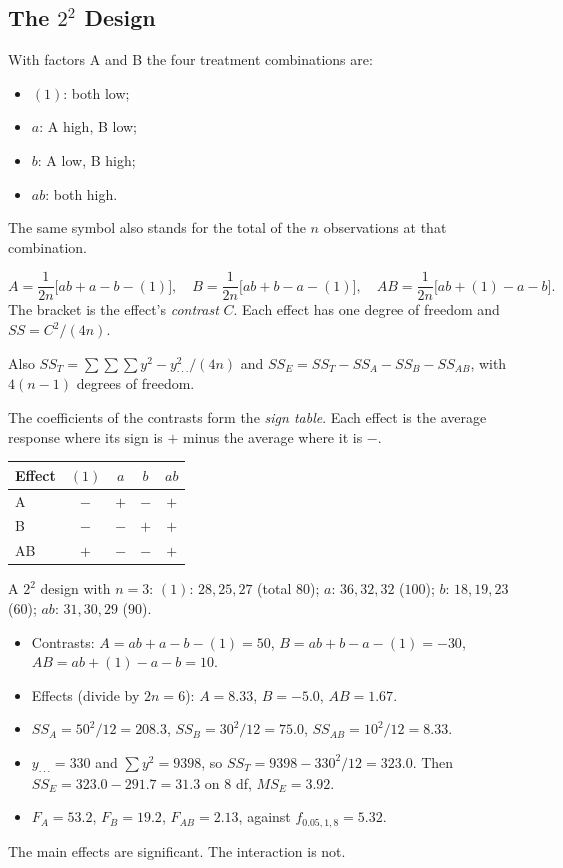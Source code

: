 \subsection{The $2^2$ Design}

With factors A and B the four treatment combinations are:
\begin{itemize}
  \item $(1)$: both low;
  \item $a$: A high, B low;
  \item $b$: A low, B high;
  \item $ab$: both high.
\end{itemize}
The same symbol also stands for the total of the $n$ observations at that combination.

\begin{theorem}\label{thm:2k2}
\[ A=\frac1{2n}\big[ab+a-b-(1)\big],\quad B=\frac1{2n}\big[ab+b-a-(1)\big],\quad AB=\frac1{2n}\big[ab+(1)-a-b\big]. \]
The bracket is the effect's \emph{contrast} $C$. Each effect has one degree of freedom and $SS=C^2/(4n)$.

Also $SS_T=\sum\sum\sum y^2-y_{\cdot\cdot\cdot}^2/(4n)$ and $SS_E=SS_T-SS_A-SS_B-SS_{AB}$, with $4(n-1)$ degrees of freedom.
\end{theorem}

The coefficients of the contrasts form the \emph{sign table}. Each effect is the average response where its sign is $+$ minus the average where it is $-$.

\begin{center}
\begin{tabular}{l|cccc}
\toprule
Effect & $(1)$ & $a$ & $b$ & $ab$\\
\midrule
A & $-$ & $+$ & $-$ & $+$\\
B & $-$ & $-$ & $+$ & $+$\\
AB & $+$ & $-$ & $-$ & $+$\\
\bottomrule
\end{tabular}
\end{center}

\begin{example}\label{ex:22}
A $2^2$ design with $n=3$: $(1)$: $28,25,27$ (total $80$); $a$: $36,32,32$ ($100$); $b$: $18,19,23$ ($60$); $ab$: $31,30,29$ ($90$).
\begin{itemize}
  \item Contrasts: $A=ab+a-b-(1)=50$, $B=ab+b-a-(1)=-30$, $AB=ab+(1)-a-b=10$.
  \item Effects (divide by $2n=6$): $A=8.33$, $B=-5.0$, $AB=1.67$.
  \item $SS_A=50^2/12=208.3$, $SS_B=30^2/12=75.0$, $SS_{AB}=10^2/12=8.33$.
  \item $y_{\cdot\cdot\cdot}=330$ and $\sum y^2=9398$, so $SS_T=9398-330^2/12=323.0$. Then $SS_E=323.0-291.7=31.3$ on $8$ df, $MS_E=3.92$.
  \item $F_A=53.2$, $F_B=19.2$, $F_{AB}=2.13$, against $f_{0.05,1,8}=5.32$.
\end{itemize}
The main effects are significant. The interaction is not.
\end{example}

